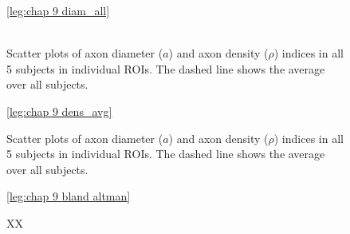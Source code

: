 \begin{figure}[ht]
	\centering
	\ref{leg:chap 9 diam_all}
	\\	
	\\
	\caption{Scatter plots of axon diameter ($a$) and axon density ($\rho$) indices in all 5 subjects in individual ROIs. The dashed line shows the average over all subjects.}
	\label{fig:chap9 scan rescan scatterplots per subject}
\end{figure}

\begin{figure}[ht]
	\centering
	\ref{leg:chap 9 dens_avg}\\	
	\caption{Scatter plots of axon diameter ($a$) and axon density ($\rho$) indices in all 5 subjects in individual ROIs. The dashed line shows the average over all subjects.}
	\label{fig:chap9 scan rescan scatterplots per subject}
\end{figure}

\begin{figure}[ht]
	\centering
	\ref{leg:chap 9 bland altman}	
	\caption{XX}
	\label{fig:chap9 bland altman plot}	
\end{figure}	



